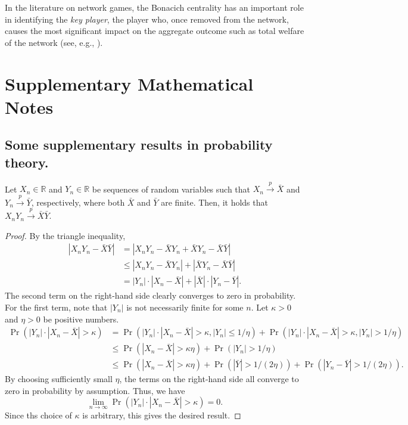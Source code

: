 \documentclass[11pt, A4paper, openany, uplatex]{book}
\begin{document}
\begin{appendices}
In the literature on network games, the Bonacich centrality has an important role in identifying the \textit{key player}, the player who, once removed from the network, causes the most significant impact on the aggregate outcome such as total welfare of the network (see, e.g., \cite{ballester2006s}).


\chapter{Supplementary Mathematical Notes}
\section{Some supplementary results in probability theory.}
\begin{lemma}\label{lem:prodconv}
Let $X_n \in \mathbb{R}$ and $Y_n \in \mathbb{R}$ be sequences of random variables such that $X_n \overset{p}{\to} \bar X$ and $Y_n \overset{p}{\to} \bar Y$, respectively, where both $\bar X$ and $\bar Y$ are finite.
Then, it holds that $X_n Y_n \overset{p}{\to} \bar X \bar Y$.
\end{lemma}

\begin{proof}
	By the triangle inequality,
	\begin{align*}
	|X_n Y_n - \bar X \bar Y|
	& = |X_n Y_n - \bar X Y_n + \bar X Y_n - \bar X \bar Y| \\
	& \le |X_n Y_n - \bar X Y_n| + |\bar X Y_n - \bar X \bar Y| \\
	& = |Y_n| \cdot |X_n - \bar X| + |\bar X |\cdot | Y_n - \bar Y|. 
	\end{align*}
	The second term on the right-hand side clearly converges to zero in probability.
	For the first term, note that $|Y_n|$ is not necessarily finite for some $n$.
	Let $\kappa > 0$ and $\eta > 0$ be positive numbers.
	 \begin{align*}
	\Pr(|Y_n| \cdot |X_n - \bar X| > \kappa) 
	& = \Pr(|Y_n| \cdot |X_n - \bar X| > \kappa, |Y_n| \le 1/\eta) +	\Pr(|Y_n| \cdot |X_n - \bar X| > \kappa, |Y_n| > 1/\eta) \\
	& \le \Pr(|X_n - \bar X| > \kappa \eta) +	\Pr(|Y_n| > 1/\eta) \\
	& \le \Pr(|X_n - \bar X| > \kappa \eta) +	\Pr(|\bar Y| > 1/(2\eta)) + \Pr(|Y_n - \bar Y| > 1/(2\eta)).
	 \end{align*}
	By choosing sufficiently small $\eta$, the terms on the right-hand side all converge to zero in probability by assumption.
	Thus, we have 
	 \[
	 \lim_{n\to\infty} \Pr(|Y_n| \cdot |X_n - \bar X| > \kappa) = 0.
	 \]
	 Since ths choice of $\kappa$ is arbitrary, this gives the desired result.
\end{proof}


\end{appendices}
\end{document}
